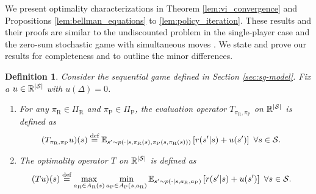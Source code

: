 \documentclass[11pt]{article}
\newtheorem{definition}{Definition}
\newcommand{\defeq}{\stackrel{\text{def}}{=}}
\newcommand{\abs}[1]{\left\lvert#1\right\rvert}
\begin{document}
        We present optimality characterizations in Theorem \ref{lem:vi_convergence} and Propositions \ref{lem:bellman_equations} to  \ref{lem:policy_iteration}. These results and their proofs are similar to the undiscounted problem in the single-player case \parencite[Section 7.2]{bertsekas_dynamic_2012} and the zero-sum stochastic game with simultaneous moves \parencite{patek_stochastic_1999}. We state and prove our results for completeness and to outline the minor differences. 
      \begin{definition}\label{defn:sg_operators}
        \normalfont
        Consider the sequential game defined in Section \ref{sec:sg-model}. Fix a $u \in \mathbb{R}^{\abs{\cal S}}$ with $u(\Delta) = 0$.
        \begin{enumerate}
            \item For any $\pi_\text{R} \in \Pi_\text{R}$ and $\pi_\text{P} \in \Pi_\text{P}$, the evaluation operator $T_{\pi_\text{R},\pi_{\text{P}}}$ on $\mathbb{R}^{\abs{\cal S}}$ is defined as
            \begingroup
            \allowdisplaybreaks
            \begin{align}
            \label{eqn:eval_operator}
            (T_{\pi_\text{R},\pi_{\text{P}}} u)(s) &\defeq \mathbb{E}_{s' \sim p(\cdot|s,\pi_\text{R}(s),\pi_\text{P}(s,\pi_\text{R}(s)))}\left[r(s'|s) + u(s')\right] \ \forall s \in {\cal S}.
            \end{align}
            \endgroup
            \item The optimality operator $T$ on $\mathbb{R}^{\abs{\cal S}}$ is defined as
            \begingroup
            \allowdisplaybreaks
            \begin{align}
            \label{eqn:bellman_operator}
            (T u)(s) &\defeq \max_{a_\text{R} \in A_\text{R}(s)}\min_{a_\text{P} \in A_\text{P}(s,a_\text{R})}\mathbb{E}_{s' \sim p(\cdot|s,a_\text{R},a_\text{P})}\left[r(s'|s) + u(s')\right] \ \forall s \in {\cal S}.
            \end{align}
            \endgroup
        \end{enumerate}       
       \end{definition}
\end{document}
